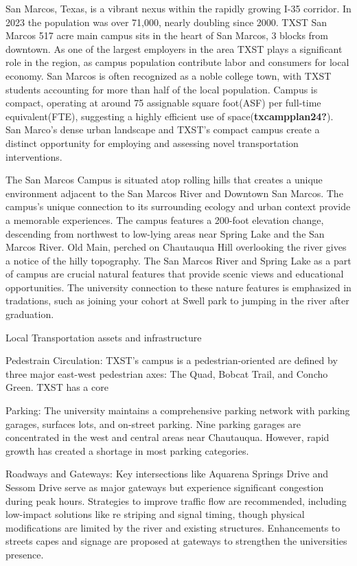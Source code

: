 \documentclass[
  letterpaper,
  DIV=11,
  numbers=noendperiod]{scrartcl}
\begin{document}
San Marcos, Texas, is a vibrant nexus within the rapidly growing I-35
corridor. In 2023 the population was over 71,000, nearly doubling since
2000. TXST San Marcos 517 acre main campus sits in the heart of San
Marcos, 3 blocks from downtown. As one of the largest employers in the
area TXST plays a significant role in the region, as campus population
contribute labor and consumers for local economy. San Marcos is often
recognized as a noble college town, with TXST students accounting for
more than half of the local population. Campus is compact, operating at
around 75 assignable square foot(ASF) per full-time equivalent(FTE),
suggesting a highly efficient use of space(\textbf{txcampplan24?}). San
Marco's dense urban landscape and TXST's compact campus create a
distinct opportunity for employing and assessing novel transportation
interventions.

The San Marcos Campus is situated atop rolling hills that creates a
unique environment adjacent to the San Marcos River and Downtown San
Marcos. The campus's unique connection to its surrounding ecology and
urban context provide a memorable experiences. The campus features a
200-foot elevation change, descending from northwest to low-lying areas
near Spring Lake and the San Marcos River. Old Main, perched on
Chautauqua Hill overlooking the river gives a notice of the hilly
topography. The San Marcos River and Spring Lake as a part of campus are
crucial natural features that provide scenic views and educational
opportunities. The university connection to these nature features is
emphasized in tradations, such as joining your cohort at Swell park to
jumping in the river after graduation.

Local Transportation assets and infrastructure

Pedestrain Circulation: TXST's campus is a pedestrian-oriented are
defined by three major east-west pedestrian axes: The Quad, Bobcat
Trail, and Concho Green. TXST has a core

Parking: The university maintains a comprehensive parking network with
parking garages, surfaces lots, and on-street parking. Nine parking
garages are concentrated in the west and central areas near Chautauqua.
However, rapid growth has created a shortage in most parking categories.

Roadways and Gateways: Key intersections like Aquarena Springs Drive and
Sessom Drive serve as major gateways but experience significant
congestion during peak hours. Strategies to improve traffic flow are
recommended, including low-impact solutions like re striping and signal
timing, though physical modifications are limited by the river and
existing structures. Enhancements to streets capes and signage are
proposed at gateways to strengthen the universities presence.
\end{document}
